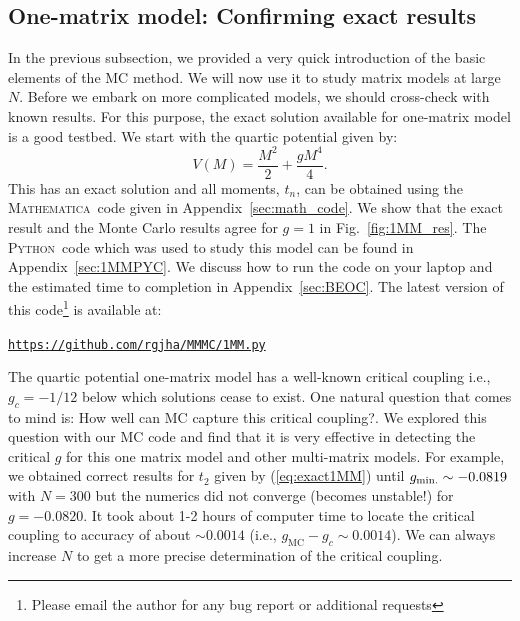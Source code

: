 \documentclass[letter,11pt]{article}
\newcommand{\MA}{\textsc{Mathematica}}
\newcommand{\PY}{\textsc{Python}}
\begin{document}
\subsection{One-matrix model: Confirming exact results} 
In the previous subsection, we provided a very quick introduction of the basic elements of the MC method. We will now use it to study matrix models at large $N$. Before we embark on more complicated models, we should cross-check with known results. For this purpose, the exact solution available for one-matrix model is a good testbed. We start with the quartic potential given by:
\begin{equation}
	V(M) = \frac{M^2}{2} + \frac{gM^4}{4}.  
\end{equation}
This has an exact solution and all moments, $t_{n}$, can be obtained using the \MA~code given in  Appendix~\ref{sec:math_code}. We show that the exact result and the Monte Carlo results agree for $g=1$ in 
Fig.~\ref{fig:1MM_res}. The \PY~code which was used to study this model can be found in Appendix~\ref{sec:1MMPYC}. 
We discuss how to run the code on your laptop and the estimated time to completion in Appendix~\ref{sec:BEOC}. The latest version of this code\footnote{Please email the author for any bug report or additional requests} is available at:
\begin{center} \texttt{\href{https://github.com/rgjha/MMMC/blob/main/1MM.py}{https://github.com/rgjha/MMMC/1MM.py}} \end{center} 
The quartic potential one-matrix model has a well-known critical coupling i.e., $ g_{c} = -1/12$ below which solutions cease to exist. One natural question that comes to mind is: How well can MC capture this critical coupling?. We explored this question with our MC code and find that it is very effective in detecting the critical $g$ for this one matrix model and other multi-matrix models. 
For example, we obtained correct results for $t_{2}$ given by (\ref{eq:exact1MM}) 
until $g_{\rm{min.}} \sim -0.0819$ with $N=300$ but the numerics did not converge (becomes 
unstable!) for $g = -0.0820$. It took about 1-2 hours of computer time to 
locate the critical coupling to accuracy of about $\sim 0.0014$ (i.e., $g_{\text{MC}} - g_{c} \sim 0.0014$). We can always increase $N$ to get a more precise determination of the critical coupling. 
\end{document}
